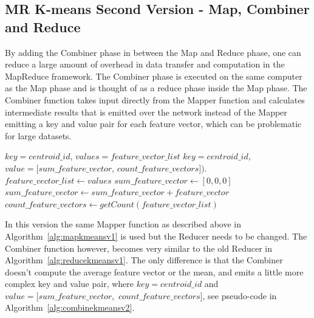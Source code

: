 \subsection{MR K-means Second Version - Map, Combiner and Reduce}
\label{sec:MapCombineReduceVersion}
By adding the Combiner phase in between the Map and Reduce phase, one can reduce a large amount of overhead in data transfer and computation in the MapReduce framework. The Combiner phase is executed on the same computer as the Map phase and is thought of as a reduce phase inside the Map phase. The Combiner function takes input directly from the Mapper function and calculates intermediate results that is emitted over the network instead of the Mapper emitting a key and value pair for each feature vector, which can be problematic for large datasets.

\begin{center}
\newcommand{\map}{\ensuremath{\mbox{\sc K-means Second Version: Combiner}}}
\begin{algorithm}[h!]
\caption{$\map(key,values)$}\label{alg:combinekmeansv2}
\begin{algorithmic}[1]
\REQUIRE $key = centroid\_id$, $values = feature\_vector\_list$
\ENSURE $key = centroid\_id$, $value = [sum\_feature\_vector$, $count\_feature\_vectors])$.
\STATE $feature\_vector\_list \leftarrow values$
\medskip
\STATE $sum\_feature\_vector \leftarrow [0, 0, 0]$
	\STATE $sum\_feature\_vector \leftarrow sum\_feature\_vector + feature\_vector$
\ENDFOR
\medskip
\STATE $count\_feature\_vectors \leftarrow getCount(feature\_vector\_list)$
\medskip
{}
\end{algorithmic}
\end{algorithm}
\end{center}

In this version the same Mapper function as described above in Algorithm~\ref{alg:mapkmeansv1} is used but the Reducer needs to be changed. The Combiner function however, becomes very similar to the old Reducer in Algorithm~\ref{alg:reducekmeansv1}. The only difference is that the Combiner doesn't compute the average feature vector or the mean, and emits a little more complex key and value pair, where $key = centroid\_id$ and $value = [sum\_feature\_vector$,~$count\_feature\_vectors]$, see pseudo-code in Algorithm~\ref{alg:combinekmeansv2}. 

